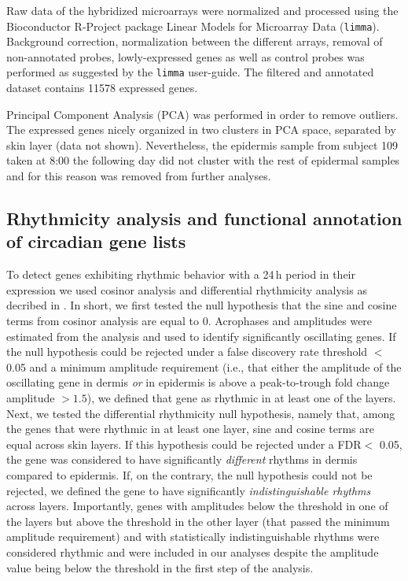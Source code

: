 Raw data of the hybridized microarrays were normalized and processed using the Bioconductor R-Project package Linear Models for Microarray Data (\texttt{limma}). Background correction, normalization between the different arrays, removal of non-annotated probes, lowly-expressed genes as well as control probes was performed as suggested by the \texttt{limma} user-guide. The filtered and annotated dataset contains 11578 expressed genes. %

Principal Component Analysis (PCA) was performed in order to remove outliers. The expressed genes nicely organized in two clusters in PCA space, separated by skin layer (data not shown). Nevertheless, the epidermis sample from subject 109 taken at 8:00 the following day did not cluster with the rest of epidermal samples and for this reason was removed from further analyses. 

\subsection*{Rhythmicity analysis and functional annotation of circadian gene lists}
To detect genes exhibiting rhythmic behavior with a 24\,h period in their expression we used cosinor analysis and differential rhythmicity analysis as decribed in \cite{Pelikan2021}. In short, we first tested the null hypothesis that the sine and cosine terms from cosinor analysis are equal to 0. Acrophases and amplitudes were estimated from the analysis and used to identify significantly oscillating genes. If the null hypothesis could be rejected under a false discovery rate threshold $<$ 0.05 and a minimum amplitude requirement (i.e., that either the amplitude of the oscillating gene in dermis \textit{or} in epidermis is above a peak-to-trough fold change amplitude $>1.5$), we defined that gene as rhythmic in at least one of the layers. Next, we tested the differential rhythmicity null hypothesis, namely that, among the genes that were rhythmic in at least one layer, sine and cosine terms are equal across skin layers. If this hypothesis could be rejected under a FDR$<$ 0.05, the gene was considered to have significantly \textit{different} rhythms in dermis compared to epidermis. If, on the contrary, the null hypothesis could not be rejected, we defined the gene to have significantly \textit{indistinguishable rhythms} across layers. Importantly, genes with amplitudes below the threshold in one of the layers but above the threshold in the other layer (that passed the minimum amplitude requirement) and with statistically indistinguishable rhythms were considered rhythmic and were included in our analyses despite the amplitude value being below the threshold in the first step of the analysis.
 
